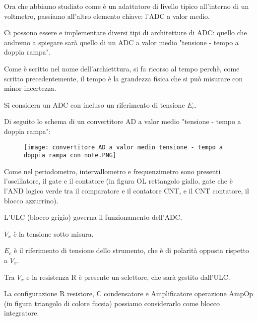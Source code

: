 Ora che abbiamo studiato come è un adattatore di livello tipico all'interno di un voltmetro, passiamo all'altro elemento chiave: l'ADC a valor medio. \newline 

Ci possono essere e implementare diversi tipi di architetture di ADC: quello che andremo a spiegare sarà quello di un ADC a valor medio "tensione - tempo a doppia rampa". \newline 

Come è scritto nel nome dell'archietttura, si fa ricorso al tempo perchè, come scritto precedentemente, il tempo è la grandezza fisica che si può misurare con minor incertezza. \newline 

Si considera un ADC con incluso un riferimento di tensione $E_c$. \newline 

Di seguito lo schema di un convertitore AD a valor medio "tensione - tempo a doppia rampa": 

\begin{figure}[h]
    \centering
    \texttt{[image: convertitore AD a valor medio tensione - tempo a doppia rampa con note.PNG]}
\end{figure}

Come nel periodometro, intervallometro e frequenzimetro sono presenti l'oscillatore, il gate e il contatore (in figura OL rettangolo giallo, gate che è l'AND logico verde tra il comparatore e il contatore CNT, e il CNT contatore, il blocco azzurrino). \newline 

L'ULC (blocco grigio) governa il funzionamento dell'ADC. \newline 

$V_x$ è la tensione sotto misura. \newline 

$E_c$ è il riferimento di tensione dello strumento, che è di polarità opposta rispetto a $V_x$. \newline 

Tra $V_x$ e la resistenza R è presente un selettore, che sarà gestito dall'ULC. \newline 

La configurazione R resistore, C condensatore e Amplificatore operazione AmpOp (in figura triangolo di colore fucsia) 
possiamo considerarlo come blocco integratore. \newline 

